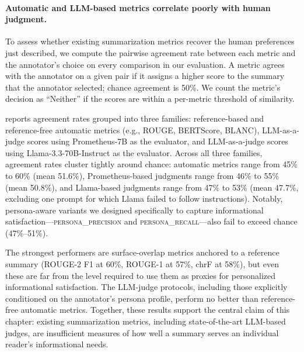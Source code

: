 



\paragraph{Automatic and LLM-based metrics correlate poorly with human judgment.}
To assess whether existing summarization metrics recover the human preferences just described, we compute the pairwise agreement rate between each metric and the annotator's choice on every comparison in our evaluation. A metric agrees with the annotator on a given pair if it assigns a higher score to the summary that the annotator selected; chance agreement is 50\%. We count the metric's decision as ``Neither'' if the scores are within a per-metric threshold of similarity. 

 reports agreement rates grouped into three families: reference-based and reference-free automatic metrics (e.g., ROUGE, BERTScore, BLANC), LLM-as-a-judge scores using Prometheus-7B as the evaluator, and LLM-as-a-judge scores using Llama-3.3-70B-Instruct as the evaluator. Across all three families, agreement rates cluster tightly around chance: automatic metrics range from 45\% to 60\% (mean 51.6\%), Prometheus-based judgments range from 46\% to 55\% (mean 50.8\%), and Llama-based judgments range from 47\% to 53\% (mean 47.7\%, excluding one prompt for which Llama failed to follow instructions). Notably, persona-aware variants we designed specifically to capture informational satisfaction---\textsc{persona\_precision} and \textsc{persona\_recall}---also fail to exceed chance (47\%--51\%).

The strongest performers are surface-overlap metrics anchored to a reference summary (ROUGE-2 F1 at 60\%, ROUGE-1 at 57\%, chrF at 58\%), but even these are far from the level required to use them as proxies for personalized informational satisfaction. The LLM-judge protocols, including those explicitly conditioned on the annotator's persona profile, perform no better than reference-free automatic metrics. Together, these results support the central claim of this chapter: existing summarization metrics, including state-of-the-art LLM-based judges, are insufficient measures of how well a summary serves an individual reader's informational needs.


